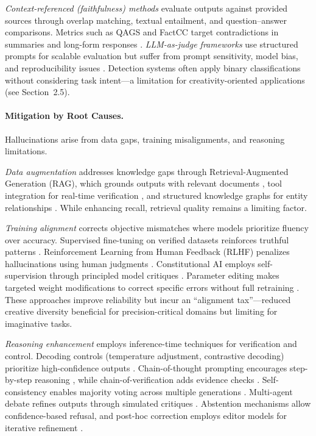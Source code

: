 \documentclass{llncs}
\begin{document}
\textit{Context-referenced (faithfulness) methods} evaluate outputs against provided sources through overlap matching, textual entailment, and question–answer comparisons. Metrics such as QAGS and FactCC target contradictions in summaries and long-form responses \cite{wang2020asking,kryscinski2020evaluating}. 
\textit{LLM-as-judge frameworks} use structured prompts for scalable evaluation but suffer from prompt sensitivity, model bias, and reproducibility issues \cite{zheng2023judging,wang2024large}. Detection systems often apply binary classifications without considering task intent—a limitation for creativity-oriented applications (see Section~2.5).

\paragraph{Mitigation by Root Causes.} 
Hallucinations arise from data gaps, training misalignments, and reasoning limitations. 

\textit{Data augmentation} addresses knowledge gaps through Retrieval-Augmented Generation (RAG), which grounds outputs with relevant documents \cite{lewis2020retrieval}, tool integration for real-time verification \cite{schick2023toolformer}, and structured knowledge graphs for entity relationships \cite{pan2024unifying}. While enhancing recall, retrieval quality remains a limiting factor.

\textit{Training alignment} corrects objective mismatches where models prioritize fluency over accuracy. Supervised fine-tuning on verified datasets reinforces truthful patterns \cite{ouyang2022training}. Reinforcement Learning from Human Feedback (RLHF) penalizes hallucinations using human judgments \cite{stiennon2020learning}. Constitutional AI employs self-supervision through principled model critiques \cite{bai2022constitutional}. Parameter editing makes targeted weight modifications to correct specific errors without full retraining \cite{meng2022locating}. These approaches improve reliability but incur an ``alignment tax''—reduced creative diversity beneficial for precision-critical domains but limiting for imaginative tasks.

\textit{Reasoning enhancement} employs inference-time techniques for verification and control. Decoding controls (temperature adjustment, contrastive decoding) prioritize high-confidence outputs \cite{li2023contrastive}. Chain-of-thought prompting encourages step-by-step reasoning \cite{wei2022chain}, while chain-of-verification adds evidence checks \cite{dhuliawala2024chain}. Self-consistency enables majority voting across multiple generations \cite{wang2023self}. Multi-agent debate refines outputs through simulated critiques \cite{du2023improving}. Abstention mechanisms allow confidence-based refusal, and post-hoc correction employs editor models for iterative refinement \cite{huang2025survey}.
\end{document}
